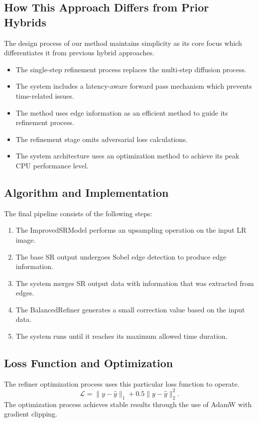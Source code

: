 \documentclass[conference]{IEEEtran}
\begin{document}
\subsection{How This Approach Differs from Prior Hybrids}
The design process of our method maintains simplicity as its core focus which differentiates it from previous hybrid approaches.

\begin{itemize}
    \item The single-step refinement process replaces the multi-step diffusion process.
    \item The system includes a latency-aware forward pass mechanism which prevents time-related issues.
    \item The method uses edge information as an efficient method to guide its refinement process.
    \item The refinement stage omits adversarial loss calculations.
    \item The system architecture uses an optimization method to achieve its peak CPU performance level.
\end{itemize}

\subsection{Algorithm and Implementation}
The final pipeline consists of the following steps:

\begin{enumerate}
    \item The ImprovedSRModel performs an upsampling operation on the input LR image.
    \item The base SR output undergoes Sobel edge detection to produce edge information.
    \item The system merges SR output data with information that was extracted from edges.
    \item The BalancedRefiner generates a small correction value based on the input data.
    \item The system runs until it reaches its maximum allowed time duration.
\end{enumerate}

\subsection{Loss Function and Optimization}
The refiner optimization process uses this particular loss function to operate.
\[
\mathcal{L} = \|y - \hat{y}\|_1 + 0.5\|y - \hat{y}\|_2^2.
\]
The optimization process achieves stable results through the use of AdamW with gradient clipping.
\end{document}
